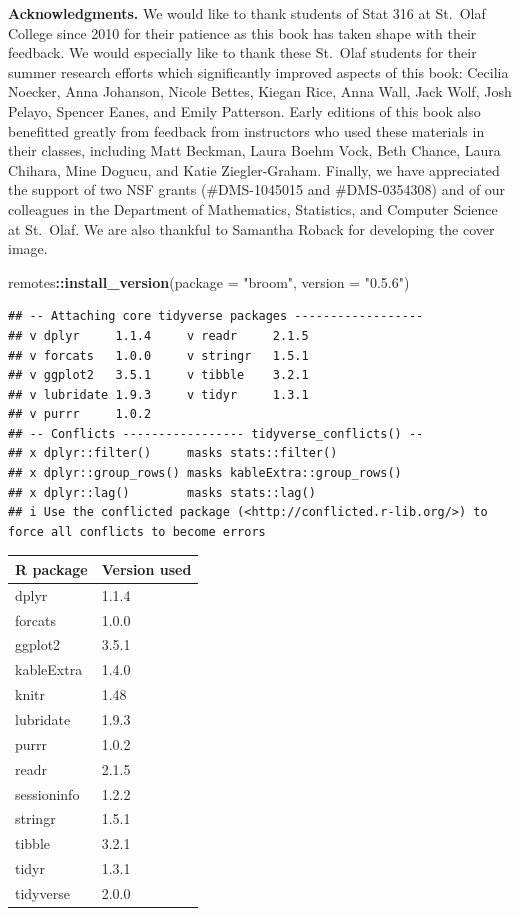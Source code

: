\documentclass[
]{krantz}
\newenvironment{Shaded}{\begin{snugshade}}{\end{snugshade}}
\newcommand{\AttributeTok}[1]{\textcolor[rgb]{0.27,0.27,0.27}{#1}}
\newcommand{\FunctionTok}[1]{\textcolor[rgb]{0.27,0.27,0.27}{\textbf{#1}}}
\newcommand{\NormalTok}[1]{#1}
\newcommand{\SpecialCharTok}[1]{\textcolor[rgb]{0.43,0.43,0.43}{\textbf{#1}}}
\newcommand{\StringTok}[1]{\textcolor[rgb]{0.5,0.5,0.5}{#1}}
\begin{document}
\textbf{Acknowledgments.} We would like to thank students of Stat 316 at St.~Olaf College since 2010 for their patience as this book has taken shape with their feedback. We would especially like to thank these St.~Olaf students for their summer research efforts which significantly improved aspects of this book: Cecilia Noecker, Anna Johanson, Nicole Bettes, Kiegan Rice, Anna Wall, Jack Wolf, Josh Pelayo, Spencer Eanes, and Emily Patterson. Early editions of this book also benefitted greatly from feedback from instructors who used these materials in their classes, including Matt Beckman, Laura Boehm Vock, Beth Chance, Laura Chihara, Mine Dogucu, and Katie Ziegler-Graham. Finally, we have appreciated the support of two NSF grants (\#DMS-1045015 and \#DMS-0354308) and of our colleagues in the Department of Mathematics, Statistics, and Computer Science at St.~Olaf. We are also thankful to Samantha Roback for developing the cover image.

\begin{Shaded}
\begin{Highlighting}[]
\NormalTok{remotes}\SpecialCharTok{::}\FunctionTok{install\_version}\NormalTok{(}\AttributeTok{package =} \StringTok{"broom"}\NormalTok{, }\AttributeTok{version =} \StringTok{"0.5.6"}\NormalTok{)}
\end{Highlighting}
\end{Shaded}

\begin{verbatim}
## -- Attaching core tidyverse packages ------------------
## v dplyr     1.1.4     v readr     2.1.5
## v forcats   1.0.0     v stringr   1.5.1
## v ggplot2   3.5.1     v tibble    3.2.1
## v lubridate 1.9.3     v tidyr     1.3.1
## v purrr     1.0.2     
## -- Conflicts ----------------- tidyverse_conflicts() --
## x dplyr::filter()     masks stats::filter()
## x dplyr::group_rows() masks kableExtra::group_rows()
## x dplyr::lag()        masks stats::lag()
## i Use the conflicted package (<http://conflicted.r-lib.org/>) to force all conflicts to become errors
\end{verbatim}

\begingroup\fontsize{9}{11}\selectfont

\begin{longtable}{ll}
\toprule
R package & Version used\\
\midrule
dplyr & 1.1.4\\
forcats & 1.0.0\\
ggplot2 & 3.5.1\\
kableExtra & 1.4.0\\
knitr & 1.48\\
lubridate & 1.9.3\\
purrr & 1.0.2\\
readr & 2.1.5\\
sessioninfo & 1.2.2\\
stringr & 1.5.1\\
tibble & 3.2.1\\
tidyr & 1.3.1\\
tidyverse & 2.0.0\\
\bottomrule
\end{longtable}
\endgroup{}
\end{document}
